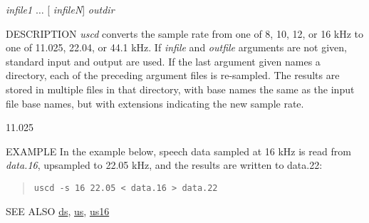 \begin{synopsis}
\item [uscd] [ --s $S$ $S$] [ {\em infile} ] [ {\em outfile} ]
\item [uscd] [ --s $S$ $S$] {\em infile1} $\dots$ [ {\em infileN}] {\em outdir} 
\end{synopsis}

\begin{qsection}{DESCRIPTION}
{\em uscd} converts the sample rate from one of 8, 10, 12, or 16 kHz 
to one of 11.025, 22.04, or 44.1 kHz.
If {\em infile} and {\em outfile} arguments are not given, 
standard input and output are used.
If the last argument given names a directory, 
each of the preceding argument files is re-sampled. 
The results are stored in multiple files in that directory, 
with base names the same as the input file base names, 
but with extensions indicating the new sample rate.
\end{qsection}

\begin{options}
		{11.025}
\end{options}

\begin{qsection}{EXAMPLE}
In the example below, speech data sampled at 16 kHz
is read from {\em data.16}, upsampled to 22.05 kHz,
and the results are written to {data.22}:
\begin{quote}
\verb!uscd -s 16 22.05 < data.16 > data.22!
\end{quote}
\end{qsection}


\begin{qsection}{SEE ALSO}
 \hyperlink{ds}{ds},
 \hyperlink{us}{us},
 \hyperlink{us16}{us16}
\end{qsection}

